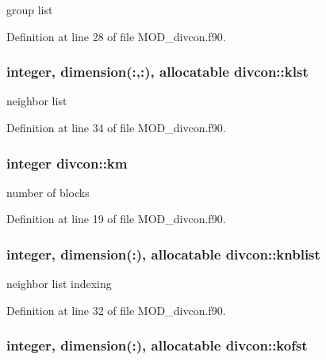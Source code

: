 group list 



Definition at line 28 of file M\-O\-D\-\_\-divcon.\-f90.

\hypertarget{classdivcon_ab2af8e112e7ff97134538cc3c57a932e}{
\subsubsection[{klst}]{\setlength{\rightskip}{0pt plus 5cm}integer, dimension(\-:,\-:), allocatable divcon\-::klst}}\label{classdivcon_ab2af8e112e7ff97134538cc3c57a932e}


neighbor list 



Definition at line 34 of file M\-O\-D\-\_\-divcon.\-f90.

\hypertarget{classdivcon_ab4439f8aee99be1a5ba1f14c1e228616}{
\subsubsection[{km}]{\setlength{\rightskip}{0pt plus 5cm}integer divcon\-::km}}\label{classdivcon_ab4439f8aee99be1a5ba1f14c1e228616}


number of blocks 



Definition at line 19 of file M\-O\-D\-\_\-divcon.\-f90.

\hypertarget{classdivcon_a946b1a91ab9c1ee815dbbc9f5773677a}{
\subsubsection[{knblist}]{\setlength{\rightskip}{0pt plus 5cm}integer, dimension(\-:), allocatable divcon\-::knblist}}\label{classdivcon_a946b1a91ab9c1ee815dbbc9f5773677a}


neighbor list indexing 



Definition at line 32 of file M\-O\-D\-\_\-divcon.\-f90.

\hypertarget{classdivcon_a323999e4a5bd8e8ea2d277eb52ee66ad}{
\subsubsection[{kofst}]{\setlength{\rightskip}{0pt plus 5cm}integer, dimension(\-:), allocatable divcon\-::kofst}}\label{classdivcon_a323999e4a5bd8e8ea2d277eb52ee66ad}


